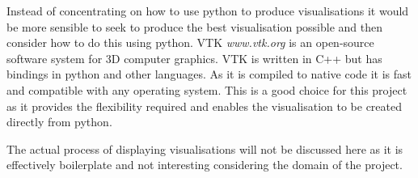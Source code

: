 Instead of concentrating on how to use python to produce visualisations it would be more sensible to seek to produce the best visualisation possible and then consider how to do this using python. VTK \textit{www.vtk.org} is an open-source software system for 3D computer graphics. VTK is written in C++ but has bindings in python and other languages. As it is compiled to native code it is fast and compatible with any operating system. This is a good choice for this project as it provides the flexibility required and enables the visualisation to be created directly from python.

The actual process of displaying visualisations will not be discussed here as it is effectively boilerplate and not interesting considering the domain of the project. 
